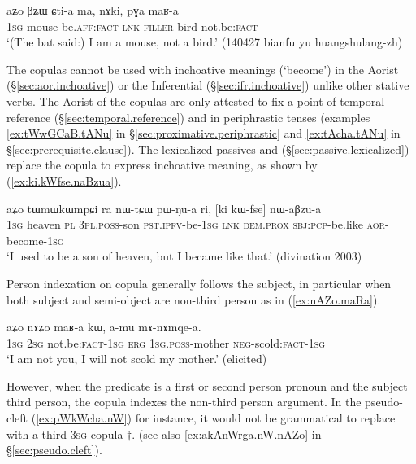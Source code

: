 \begin{exe}
\ex \label{ex:Ctia.ma.maRa}
\gll  aʑo βʑɯ ɕti-a ma, nɤki, pɣa maʁ-a \\
\textsc{1sg} mouse be.\textsc{aff}:\textsc{fact} \textsc{lnk} \textsc{filler} bird not.be:\textsc{fact} \\
\glt  `(The bat said:) I am a mouse, not a bird.' (140427 bianfu yu huangshulang-zh)
\end{exe} 

The copulas cannot be used with inchoative meanings (`become')  in the Aorist (§\ref{sec:aor.inchoative}) or the Inferential (§\ref{sec:ifr.inchoative}) unlike other stative verbs. The Aorist of the copulas are only attested to fix a point of temporal reference (§\ref{sec:temporal.reference}) and in periphrastic tenses (examples \ref{ex:tWwGCaB.tANu} in  §\ref{sec:proximative.periphrastic} and \ref{ex:tAcha.tANu} in  §\ref{sec:prerequisite.clause}). The lexicalized passives   and   (§\ref{sec:passive.lexicalized}) replace the copula to express inchoative meaning, as shown by (\ref{ex:ki.kWfse.naBzua}). 

\begin{exe}
\ex \label{ex:ki.kWfse.naBzua}
\gll   aʑo tɯmɯkɯmpɕi ra nɯ-tɕɯ pɯ-ŋu-a ri, [ki kɯ-fse] nɯ-aβzu-a \\
\textsc{1sg} heaven \textsc{pl} \textsc{3pl}.\textsc{poss}-son \textsc{pst}.\textsc{ipfv}-be-\textsc{1sg} \textsc{lnk} \textsc{dem}.\textsc{prox} \textsc{sbj}:\textsc{pcp}-be.like \textsc{aor}-become-\textsc{1sg} \\
\glt `I used to be a son of heaven, but I became like that.' (divination 2003)
\end{exe}

Person indexation on copula generally follows the subject, in particular when both subject and semi-object are non-third person as in (\ref{ex:nAZo.maRa}).

\begin{exe}
\ex \label{ex:nAZo.maRa}
\gll aʑo nɤʑo maʁ-a kɯ, a-mu mɤ-nɤmqe-a. \\
\textsc{1sg} \textsc{2sg} not.be:\textsc{fact}-\textsc{1sg} \textsc{erg} \textsc{1sg}.\textsc{poss}-mother \textsc{neg}-scold:\textsc{fact}-\textsc{1sg} \\
\glt `I am not you, I will not scold my mother.' (elicited)
\end{exe}

However, when the predicate is a first or second person pronoun and the subject third person, the copula indexes the non-third person argument. In the pseudo-cleft (\ref{ex:pWkWcha.nW})  for instance, it would not be  grammatical to  replace   with a third \textsc{3sg} copula $\dagger$. (see also  \ref{ex:akAnWrga.nW.nAZo} in §\ref{sec:pseudo.cleft}).  

